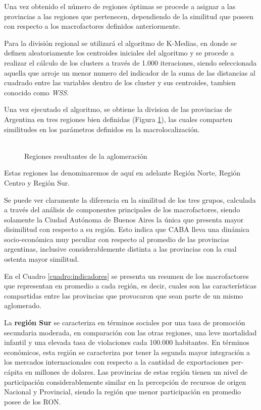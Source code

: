\documentclass[12pt,a4paper]{article}
\begin{document}
Una vez obtenido el número de regiones óptimas se procede a asignar a las provincias a las regiones que pertenecen, dependiendo de la similitud que poseen con respecto a los macrofactores definidos anteriormente.

Para la división regional se utilizará el algoritmo de K-Medias, en donde se definen aleatoriamente los centroides iniciales del algoritmo y se procede a realizar el cálculo de los clusters a través de 1.000 iteraciones, siendo seleccionada aquella  que arroje un menor numero del indicador de la suma de las distancias al cuadrado entre las variables dentro de  los cluster y sus centroides, tambien conocido como \textit{WSS}.

Una vez ejecutado el algoritmo, se obtiene la division de las provincias de Argentina en tres regiones bien definidas (Figura \ref{figure:reg_resultantes}), las cuales comparten similitudes en los parámetros definidos en la macrolocalización.


\begin{figure}[ht!]
\begin{center}
\caption{\\Regiones resultantes de la aglomeración}

\label{figure:reg_resultantes}
\end{center}
\end{figure}
\newpage

Estas regiones las denominaremos de aquí en adelante Región Norte, Región Centro y Región Sur.

Se puede ver claramente la diferencia en la similitud de los tres grupos, calculada a través del análisis de componentes principales de los macrofactores, siendo solamente la Ciudad Autónoma de Buenos Aires la única que presenta mayor disimilitud con respecto a su región.
Esto indica que CABA  lleva una dinámica socio-económica muy peculiar con respecto al promedio de las provincias argentinas, inclusive considerablemente distinta a las provincias con la cual ostenta mayor similitud.

En el Cuadro \ref{cuadro:indicadores} se presenta un resumen de los macrofactores que representan en promedio a cada región, es decir, cuales son las características compartidas entre las provincias que provocaron que sean parte de un mismo aglomerado.

La \textbf{región Sur} se caracteriza en términos sociales por una tasa de promoción secundaria moderada, en comparación con las otras regiones, una leve mortalidad infantil y una elevada tasa de violaciones cada 100.000 habitantes. En términos económicos, esta región se caracteriza por tener la segunda mayor integración a los mercados internacionales con respecto a la cantidad de exportaciones per-cápita en millones de dolares. Las provincias de estas región tienen un nivel de participación considerablemente similar en la percepción de recursos de origen Nacional y Provincial, siendo la región que menor participación en promedio posee de los RON.
\end{document}

